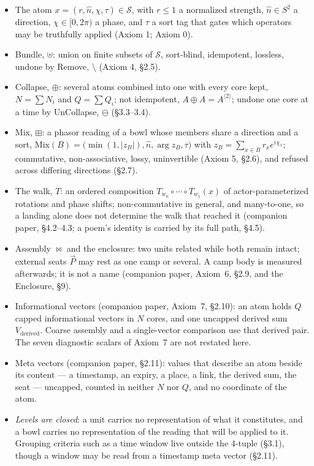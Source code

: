 \documentclass[12pt, a4paper]{article}
\begin{document}
\begin{itemize}
\item The atom $x=(r,\hat n,\chi,\tau)\in\mathcal{S}$, with $r\le 1$ a
      normalized strength, $\hat n\in S^2$ a direction, $\chi\in[0,2\pi)$
      a phase, and $\tau$ a sort tag that gates which operators may be
      truthfully applied (Axiom 1; Axiom 0).
\item Bundle, $\uplus$: union on finite subsets of $\mathcal{S}$,
      sort-blind, idempotent, lossless, undone by Remove, $\setminus$
      (Axiom 4, \S2.5).
\item Collapse, $\oplus$: several atoms combined into one with every
      core kept, $N=\sum N_i$ and $Q=\sum Q_i$; not idempotent,
      $A\oplus A=A^{\langle 2\rangle}$; undone one core at a time by
      UnCollapse, $\ominus$ (\S3.3--3.4).
\item Mix, $\boxplus$: a phasor reading of a bowl whose members share a
      direction and a sort,
      $\mathrm{Mix}(B)=\bigl(\min(1,|z_B|),\hat n,\arg z_B,\tau\bigr)$
      with $z_B=\sum_{x\in B} r_x e^{i\chi_x}$; commutative,
      non-associative, lossy, uninvertible (Axiom 5, \S2.6), and refused across differing directions (\S2.7).
\item The walk, $T$: an ordered composition
      $T_{w_n}\circ\cdots\circ T_{w_1}(x)$ of actor-parameterized
      rotations and phase shifts; non-commutative in general, and
      many-to-one, so a landing alone does not determine the walk that
      reached it (companion paper, \S4.2--4.3; a poem's identity is carried by its full path, \S4.5).
\item Assembly $\bowtie$ and the enclosure: two units related while
      both remain intact; external seats $\vec P$ may rest as one
      camp or several. A camp body is measured afterwards; it is not
      a name (companion paper, Axiom~6, \S2.9, and the Enclosure, \S9).
\item Informational vectors (companion paper, Axiom~7, \S2.10): an
      atom holds $Q$ capped informational vectors in $N$ cores, and one
      uncapped derived sum $V_{\mathrm{derived}}$. Coarse assembly and
      a single-vector comparison use that derived pair. The seven
      diagnostic scalars of Axiom~7 are not restated here.
\item Meta vectors (companion paper, \S2.11): values that describe an
      atom beside its content --- a timestamp, an expiry, a place, a
      link, the derived sum, the seat --- uncapped, counted in neither
      $N$ nor $Q$, and no coordinate of the atom.
\item \emph{Levels are closed}: a unit carries no representation of
      what it constitutes, and a bowl carries no representation of the
      reading that will be applied to it. Grouping criteria such as a time window live outside the 4-tuple (\S3.1), though a window may be read
      from a timestamp meta vector (\S2.11).
\end{itemize}
\end{document}
